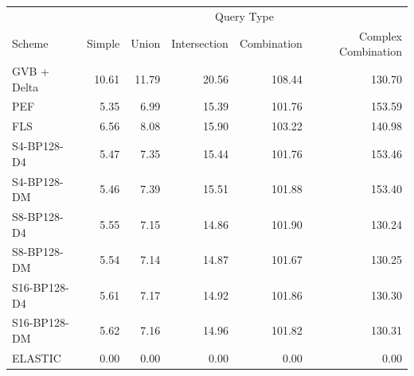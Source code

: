 \begin{tabular}{lrrrrr}
\toprule
 & \multicolumn{5}{c}{Query Type} \\
Scheme & Simple & Union & Intersection & Combination & Complex Combination \\
\midrule
GVB + Delta & 10.61 & 11.79 & 20.56 & 108.44 & 130.70 \\
PEF & 5.35 & 6.99 & 15.39 & 101.76 & 153.59 \\
FLS & 6.56 & 8.08 & 15.90 & 103.22 & 140.98 \\
S4-BP128-D4 & 5.47 & 7.35 & 15.44 & 101.76 & 153.46 \\
S4-BP128-DM & 5.46 & 7.39 & 15.51 & 101.88 & 153.40 \\
S8-BP128-D4 & 5.55 & 7.15 & 14.86 & 101.90 & 130.24 \\
S8-BP128-DM & 5.54 & 7.14 & 14.87 & 101.67 & 130.25 \\
S16-BP128-D4 & 5.61 & 7.17 & 14.92 & 101.86 & 130.30 \\
S16-BP128-DM & 5.62 & 7.16 & 14.96 & 101.82 & 130.31 \\
ELASTIC & 0.00 & 0.00 & 0.00 & 0.00 & 0.00 \\
\bottomrule
\end{tabular}
